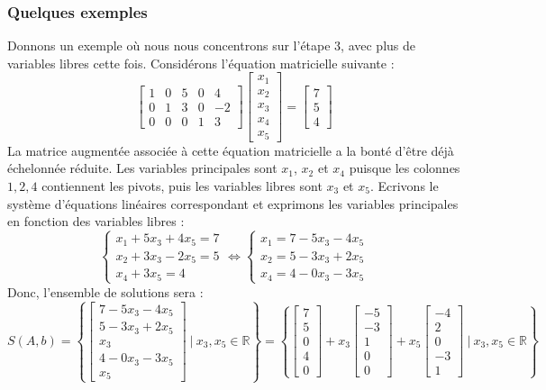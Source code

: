 \documentclass{article}
\newcommand{\R}{\mathbb{R}}
\begin{document}
\subsubsection*{Quelques exemples}
\noindent Donnons un exemple où nous nous concentrons sur l'étape 3, avec plus de variables libres cette fois. Considérons l'équation matricielle suivante :
$$
\begin{bmatrix}
1 & 0 & 5 & 0 & 4\\
0 & 1 & 3 & 0 & -2\\
0 & 0 & 0 & 1 & 3
\end{bmatrix}
\begin{bmatrix}
x_1 \\x_2 \\ x_3 \\ x_4 \\ x_5
\end{bmatrix}
=
\begin{bmatrix}
7 \\ 5\\ 4
\end{bmatrix}
$$
La matrice augmentée associée à cette équation matricielle a la bonté d'être déjà échelonnée réduite. Les variables principales sont $x_1$, $x_2$ et $x_4$ puisque les colonnes $1, 2, 4$ contiennent les pivots, puis les variables libres sont $x_3$ et $x_5$. Ecrivons le système d'équations linéaires correspondant et exprimons les variables principales en fonction des variables libres :
$$
\begin{cases}
x_1 + 5x_3 + 4x_5 = 7\\
x_2 + 3x_3 -2x_5 = 5\\
x_4 + 3x_5 = 4
\end{cases}
\iff 
\begin{cases}
x_1 = 7 - 5x_3 -4x_5\\
x_2 = 5 - 3x_3 + 2x_5\\
x_4 = 4 - 0x_3 - 3x_5
\end{cases}
$$
Donc, l'ensemble de solutions sera :
$$
S(A,b) = \left\{
\begin{bmatrix}
7 - 5x_3 -4x_5\\
5 - 3x_3 + 2x_5\\
x_3\\
4 - 0x_3 - 3x_5\\
x_5
\end{bmatrix} \ | \ x_3, x_5 \in \R
\right\} = \left\{
\begin{bmatrix}
7 \\
5 \\
0\\
4\\
0
\end{bmatrix} + x_3\begin{bmatrix}
-5\\
-3\\
1\\
0\\
0
\end{bmatrix} + x_5\begin{bmatrix}
-4\\
2\\
0\\
-3\\
1
\end{bmatrix} \ | \ x_3, x_5 \in \R
\right\}
$$
\end{document}
